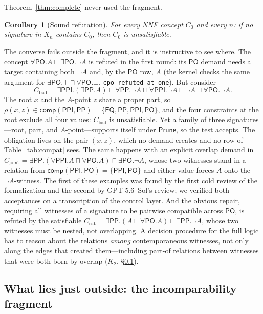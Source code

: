 \documentclass[11pt]{article}
\newcommand{\PO}{\mathsf{PO}}
\newcommand{\PP}{\mathsf{PP}}
\newcommand{\PPI}{\mathsf{PPI}}
\newcommand{\EQ}{\mathsf{EQ}}
\newcommand{\comp}{\mathsf{comp}}
\newcommand{\Prune}{\mathsf{Prune}}
\newcommand{\code}[1]{\texttt{#1}}
\theoremstyle{plain}
\newtheorem{corollary}[theorem]{Corollary}
\theoremstyle{definition}
\begin{document}
Theorem~\ref{thm:complete} never used the fragment.

\begin{corollary}[Sound refutation]\label{cor:unsat}
For every NNF concept $C_0$ and every $n$: if no signature in $X_n$ contains
$C_0$, then $C_0$ is unsatisfiable.
\end{corollary}

The converse fails outside the fragment, and it is instructive to see where.
The concept $\forall\PO.A\sqcap\exists\PO.\neg A$ is refuted in the first round:
its $\PO$ demand needs a target containing both $\neg A$ and, by the $\PO$ row,
$A$ (the kernel checks the same argument for $\exists\PO.\top\sqcap\forall\PO.\bot$,
\code{cpo\_refuted\_at\_one}). But consider
\[
  C_{\mathrm{bad}}=\exists\PPI.(\exists\PP.A)\sqcap\forall\PP.\neg A\sqcap
  \forall\PPI.\neg A\sqcap\neg A\sqcap\forall\PO.\neg A .
\]
The root $x$ and the $A$-point $z$ share a proper part, so
$\rho(x,z)\in\comp(\PPI,\PP)=\{\EQ,\PP,\PPI,\PO\}$, and the four constraints at
the root exclude all four values: $C_{\mathrm{bad}}$ is unsatisfiable. Yet a
family of three signatures---root, part, and $A$-point---supports itself under
$\Prune$, so the test accepts. The obligation lives on the pair $(x,z)$, which no
demand creates and no row of Table~\ref{tab:compat} sees. The same happens with
an explicit overlap demand in
$C_{\mathrm{joint}}=\exists\PP.(\forall\PPI.A\sqcap\forall\PO.A)\sqcap
\exists\PO.\neg A$, whose two witnesses stand in a relation from
$\comp(\PPI,\PO)=\{\PPI,\PO\}$ and either value forces $A$ onto the
$\neg A$-witness. The first of these examples was found by the first cold review
of the formalization and the second by GPT-5.6~Sol's review; we verified both
acceptances on a transcription of the control layer. And the obvious repair,
requiring all witnesses of a signature to be pairwise compatible across $\PO$,
is refuted by the satisfiable
$C_{\mathrm{sat}}=\exists\PP.(A\sqcap\forall\PO.A)\sqcap\exists\PP.\neg A$,
whose two witnesses must be nested, not overlapping. A decision procedure for
the full logic has to reason about the relations \emph{among} contemporaneous
witnesses, not only along the edges that created them---including part-of
relations between witnesses that were both born by overlap ($K_2$,
\S\ref{ssec:bridge}).

\subsection{What lies just outside: the incomparability fragment}
\label{ssec:bridge}
\end{document}
